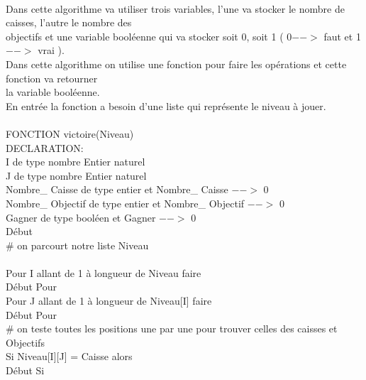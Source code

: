 \documentclass{article}
\begin{document}
\begin{tabbing}
\\Dans cette algorithme va utiliser trois variables, l'une va stocker le nombre de caisses, l'autre le nombre des
\\ objectifs et une variable booléenne qui va stocker soit 0, soit 1 ( 0$-->$ faut et 1 $-->$ vrai ).\\
Dans cette algorithme on utilise une fonction pour faire les opérations et cette fonction va retourner
\\ la variable booléenne.\\
En entrée la fonction a besoin d'une liste qui représente le niveau à jouer.
\\
\\FONCTION victoire(Niveau)
\\DECLARATION:
\\ \hspace{1cm}	I de type nombre Entier naturel
\\ \hspace{1cm}	J de type nombre Entier naturel
\\ \hspace{1cm}	Nombre\_ Caisse de type entier et Nombre\_ Caisse $-->$ 0
\\ \hspace{1cm}	Nombre\_ Objectif de type entier et Nombre\_ Objectif $-->$ 0
\\ \hspace{1cm}	Gagner de type booléen et Gagner $-->$ 0
\\Début 
\\ \hspace{1cm}	\# on parcourt notre liste Niveau 
\\
\\ \hspace{1cm}	Pour I allant de 1 à longueur de Niveau faire
\\ \hspace{1cm}	Début Pour
\\ \hspace{2cm}		Pour J allant de 1 à longueur de Niveau[I] faire
\\	\hspace{2cm}	Début Pour
\\	\hspace{3cm}		\# on teste toutes les positions une par une pour trouver celles des caisses et Objectifs
\\	\hspace{3cm}		Si Niveau[I][J] = Caisse alors
\\	\hspace{3cm}		Début Si

\end{tabbing}
\end{document}
